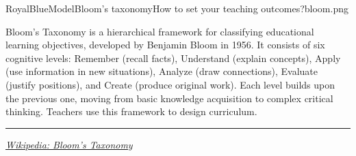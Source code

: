\begin{educardf}{RoyalBlue}{\faShapes}{Model}{Bloom's taxonomy}{How to set your teaching outcomes?}{bloom.png}

Bloom's Taxonomy is a hierarchical framework for classifying educational learning objectives, developed by Benjamin Bloom in 1956. It consists of six cognitive levels: Remember (recall facts), Understand (explain concepts), Apply (use information in new situations), Analyze (draw connections), Evaluate (justify positions), and Create (produce original work). Each level builds upon the previous one, moving from basic knowledge acquisition to complex critical thinking. Teachers use this framework to design curriculum.

\vspace{20pt}

\rule{\textwidth}{0.4pt}

\textit{ \faGlobe \hspace{1pt} \href{wikipedia.org/wiki/Bloom\%27s_taxonomy}{Wikipedia: Bloom's Taxonomy}}

\end{educardf}


